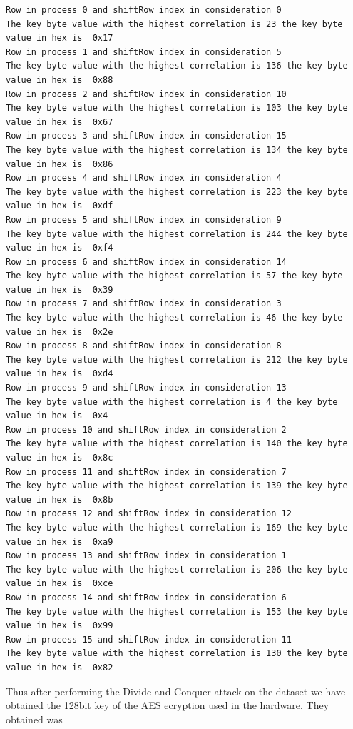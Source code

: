\documentclass[12pt, letterpaper, oneside]{report}
\begin{document}
\begin{lstlisting}
Row in process 0 and shiftRow index in consideration 0
The key byte value with the highest correlation is 23 the key byte value in hex is  0x17
Row in process 1 and shiftRow index in consideration 5
The key byte value with the highest correlation is 136 the key byte value in hex is  0x88
Row in process 2 and shiftRow index in consideration 10
The key byte value with the highest correlation is 103 the key byte value in hex is  0x67
Row in process 3 and shiftRow index in consideration 15
The key byte value with the highest correlation is 134 the key byte value in hex is  0x86
Row in process 4 and shiftRow index in consideration 4
The key byte value with the highest correlation is 223 the key byte value in hex is  0xdf
Row in process 5 and shiftRow index in consideration 9
The key byte value with the highest correlation is 244 the key byte value in hex is  0xf4
Row in process 6 and shiftRow index in consideration 14
The key byte value with the highest correlation is 57 the key byte value in hex is  0x39
Row in process 7 and shiftRow index in consideration 3
The key byte value with the highest correlation is 46 the key byte value in hex is  0x2e
Row in process 8 and shiftRow index in consideration 8
The key byte value with the highest correlation is 212 the key byte value in hex is  0xd4
Row in process 9 and shiftRow index in consideration 13
The key byte value with the highest correlation is 4 the key byte value in hex is  0x4
Row in process 10 and shiftRow index in consideration 2
The key byte value with the highest correlation is 140 the key byte value in hex is  0x8c
Row in process 11 and shiftRow index in consideration 7
The key byte value with the highest correlation is 139 the key byte value in hex is  0x8b
Row in process 12 and shiftRow index in consideration 12
The key byte value with the highest correlation is 169 the key byte value in hex is  0xa9
Row in process 13 and shiftRow index in consideration 1
The key byte value with the highest correlation is 206 the key byte value in hex is  0xce
Row in process 14 and shiftRow index in consideration 6
The key byte value with the highest correlation is 153 the key byte value in hex is  0x99
Row in process 15 and shiftRow index in consideration 11
The key byte value with the highest correlation is 130 the key byte value in hex is  0x82
\end{lstlisting}

Thus after performing the Divide and Conquer attack on the dataset we have obtained the 128bit key of the AES ecryption used in the hardware. They obtained was
\end{document}
